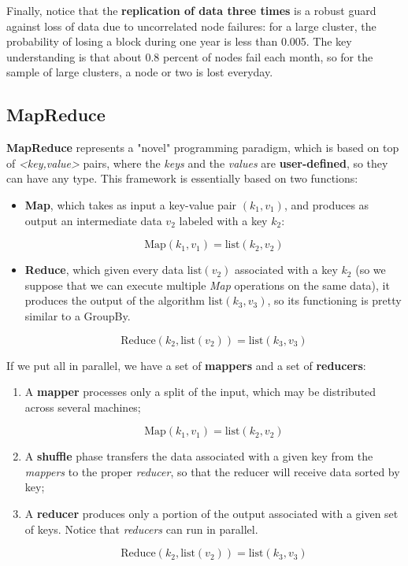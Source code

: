 Finally, notice that the \textbf{replication of data three times} is a robust guard against loss of data due to uncorrelated node failures: for a large cluster, the probability of losing a block during one year is less than 0.005. The key understanding is that about 0.8 percent of nodes fail each month, so for the sample of large clusters, a node or two is lost everyday.

\subsection{MapReduce}
\textbf{MapReduce} represents a "novel" programming paradigm, which is based on top of \textit{<key,value>} pairs, where the \textit{keys} and the \textit{values} are \textbf{user-defined}, so they can have any type. This framework is essentially based on two functions:

\begin{itemize}
    \item \textbf{Map}, which takes as input a key-value pair $(k_1, v_1)$, and produces as output an intermediate data $v_2$ labeled with a key $k_2$:

    $$
    \text{Map}(k_1, v_1) = \text{list}(k_2, v_2)
    $$
    
    \item \textbf{Reduce}, which given every data $\text{list}(v_2)$ associated with a key $k_2$ (so we suppose that we can execute multiple \textit{Map} operations on the same data), it produces the output of the algorithm $\text{list}(k_3, v_3)$, so its functioning is pretty similar to a GroupBy.

    $$
    \text{Reduce}(k_2, \text{list}(v_2)) = \text{list}(k_3, v_3)
    $$
\end{itemize}

If we put all in parallel, we have a set of \textbf{mappers} and a set of \textbf{reducers}:

\begin{enumerate}
    \item A \textbf{mapper} processes only a split of the input, which may be distributed across several machines;

    $$
    \text{Map}(k_1, v_1) = \text{list}(k_2, v_2)
    $$
    
    \item A \textbf{shuffle} phase transfers the data associated with a given key from the \textit{mappers} to the proper \textit{reducer}, so that the reducer will receive data sorted by key;
    \item A \textbf{reducer} produces only a portion of the output associated with a given set of keys. Notice that \textit{reducers} can run in parallel.

    $$
    \text{Reduce}(k_2, \text{list}(v_2)) = \text{list}(k_3, v_3)
    $$
    
\end{enumerate}

